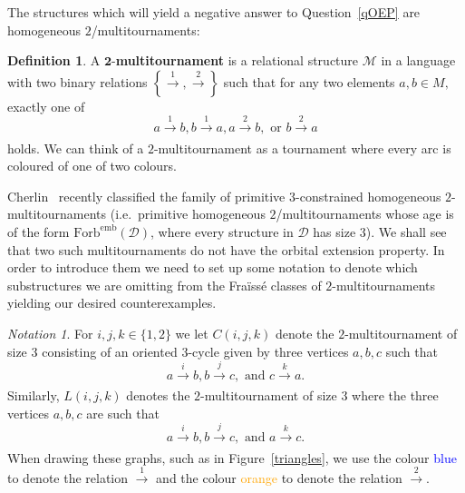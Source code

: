 \documentclass{article}
\theoremstyle{remark}
\newtheorem{notation}[theorem]{Notation}
\theoremstyle{definition}
\newtheorem{definition}[theorem]{Definition}
\begin{document}
The structures which will yield a negative answer to Question~\ref{qOEP} are homogeneous $2$\-/multitournaments:


\begin{definition} A $\bm{2}$-\textbf{multitournament} is a relational structure $\mathcal{M}$ in a language with two binary relations $\left\{\xrightarrow[]{1}, \xrightarrow[]{2}\right\}$ such that for any two elements $a,b\in M,$ exactly one of \[a\xrightarrow[]{1}b, b\xrightarrow[]{1}a, a\xrightarrow[]{2}b, \text{ or } b\xrightarrow[]{2}a\]
holds. We can think of a $2$-multitournament as a tournament where every arc is coloured of one of two colours. 
\end{definition}

Cherlin~\cite[Table 18.1]{Cherlinclass} recently classified the family of primitive $3$-constrained homogeneous $2$-multitournaments (i.e.~primitive homogeneous $2$\-/multitournaments whose age is of the form $\mathrm{Forb}^{\mathrm{emb}}(\mathcal{D})$, where every structure in $\mathcal{D}$ has size $3$). We shall see that two such multitournaments do not have the orbital extension property. In order to introduce them we need to set up some notation to denote which substructures we are omitting from the Fra\"{i}ss\'{e} classes of $2$-multitournaments yielding our desired counterexamples.

\begin{notation} For $i,j,k\in\{1,2\}$ we let  $C(i,j,k)$ denote the $2$-multitournament of size $3$ consisting of an oriented $3$-cycle given by three vertices $a,b,c$ such that 
\[a\xrightarrow[]{i}b, b\xrightarrow[]{j}c, \text{ and }c\xrightarrow[]{k}a.\]
Similarly, $L(i,j,k)$ denotes the $2$-multitournament of size $3$ where the three vertices $a,b,c$ are such that 
\[a\xrightarrow[]{i}b, b\xrightarrow[]{j}c, \text{ and }a\xrightarrow[]{k}c.\]
When drawing these graphs, such as in Figure~\ref{triangles}, we use the colour \textcolor{Blue}{blue} to denote the relation $\xrightarrow[]{1}$ and the colour \textcolor{orange}{orange} to denote the relation $\xrightarrow[]{2}$.
\end{notation}


\newcommand{\midarrow}{\tikz \draw[-triangle 90] (0,0) -- +(.1,0);}
\end{document}
